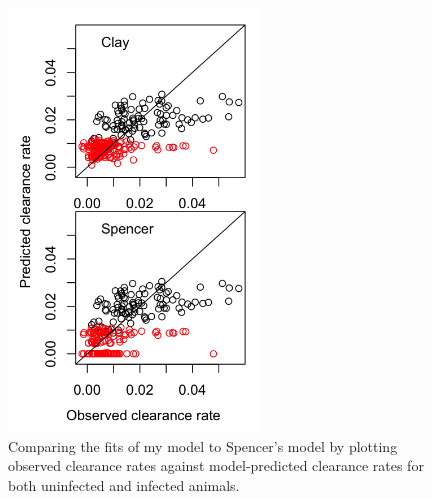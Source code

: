 \documentclass[12pt,reqno,final,pdftex]{amsart}\usepackage[]{graphicx}\usepackage[]{color}
\newenvironment{knitrout}{}{} %
\theoremstyle{plain}
\numberwithin{equation}{part}
\begin{document}
\begin{knitrout}\scriptsize
{}\color{fgcolor}\begin{figure}

\includegraphics[width=0.6\textwidth]{figure/Clay-vs-Spencer-1} \hfill{}

\caption[Comparing the fits of my model to Spencer's model by plotting observed clearance rates against model-predicted clearance rates for both uninfected and infected animals]{Comparing the fits of my model to Spencer's model by plotting observed clearance rates against model-predicted clearance rates for both uninfected and infected animals.}\label{fig:Clay-vs-Spencer}
\end{figure}


\end{knitrout}

\clearpage
\end{document}
